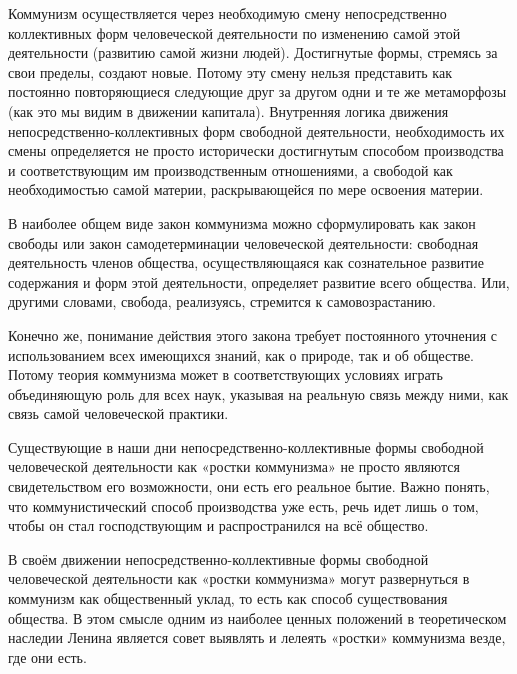 \documentclass[../main]{subfiles}
\begin{document}
Коммунизм осуществляется через необходимую смену непосредственно коллективных форм человеческой деятельности по изменению самой этой деятельности (развитию самой жизни людей). Достигнутые формы, стремясь за свои пределы, создают новые. Потому эту смену нельзя представить как постоянно повторяющиеся следующие друг за другом одни и те же метаморфозы (как это мы видим в движении капитала). Внутренняя логика движения непосредственно-коллективных форм свободной деятельности, необходимость их смены определяется не просто исторически достигнутым способом производства и соответствующим им производственным отношениями, а свободой как необходимостью самой материи, раскрывающейся по мере освоения материи.

В наиболее общем виде закон коммунизма можно сформулировать как закон свободы или закон самодетерминации человеческой деятельности: свободная деятельность членов общества, осуществляющаяся как сознательное развитие содержания и форм этой деятельности, определяет развитие всего общества. Или, другими словами, свобода, реализуясь, стремится к самовозрастанию.

Конечно же, понимание действия этого закона требует постоянного уточнения с использованием всех имеющихся знаний, как о природе, так и об обществе. Потому теория коммунизма может в соответствующих условиях играть объединяющую роль для всех наук, указывая на реальную связь между ними, как связь самой человеческой практики.

Существующие в наши дни непосредственно-коллективные формы свободной человеческой деятельности как «ростки коммунизма» не просто являются свидетельством его возможности, они есть его реальное бытие. Важно понять, что коммунистический способ производства уже есть, речь идет лишь о том, чтобы он стал господствующим и распространился на всё общество.

В своём движении непосредственно-коллективные формы свободной человеческой деятельности как «ростки коммунизма» могут развернуться в коммунизм как общественный уклад, то есть как способ существования общества. В этом смысле одним из наиболее ценных положений в теоретическом наследии Ленина является совет выявлять и лелеять «ростки» коммунизма везде, где они есть.
\end{document}
